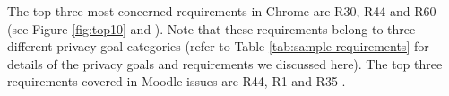 \begin{comment}
\begin{table}[ht]
	\centering
	\caption{The number of privacy requirements in each category and the percentage of occurrences in Chrome and Moodle issue reports}
	\label{tab:req-occurrences}
	\resizebox{3.25in}{!}{%
		\begin{tabular}{p{3cm} c c c}
			\toprule
			\multicolumn{1}{c}{\multirow{2}{*}{\textbf{Privacy goals}}} & \multicolumn{1}{c}{\multirow{2}{*}{\begin{tabular}[c]{@{}c@{}}\textbf{No. of privacy }\\\textbf{requirements~ }\end{tabular}}} & \multicolumn{2}{c}{\begin{tabular}[c]{@{}c@{}}\textbf{Percentage of}\\\textbf{occurrences (\%) }\end{tabular}} \\
			\cline{3-4}
			\multicolumn{1}{c}{} & \multicolumn{1}{c}{} & \multicolumn{1}{c}{\begin{tabular}[c]{@{}c@{}}\textbf{Google }\\\textbf{Chrome}\end{tabular}} & \multicolumn{1}{c}{\textbf{Moodle}} \\
			\midrule
			User participation & 9 & 35.83 & 68.62\\
			Notice & 32 & 30.36 & 47.91\\
			User desirability & 10 & 28.01 & 40.59\\
			Data processing & 16 & 13.06 & 11.51\\
			Breach & 6 & 0.00 & 0.00\\
			Complaint/Request & 5 & 0.11 & 1.88\\
			Security & 13 & 17.86 & 44.77\\
			\hline
			\multicolumn{4}{p{8.5cm}}{\footnotesize *Since one issue can relate to multiple privacy requirements, the sum of percentage exceeds 100\%} \setlength\lineskip{0pt}
		\end{tabular}%
	}
\end{table}
\end{comment}

The top three most concerned requirements in Chrome are R30, R44 and R60 (see Figure \ref{fig:top10} and ). Note that these requirements belong to three different privacy goal categories (refer to Table \ref{tab:sample-requirements} for details of the privacy goals and requirements we discussed here). The top three requirements covered in Moodle issues are R44, R1 and R35 . %

